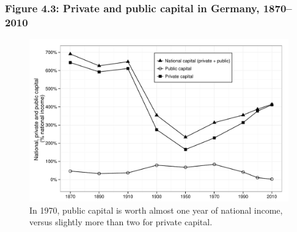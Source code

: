 \documentclass[t]{beamer}\usepackage[]{graphicx}\usepackage[]{color}
\newenvironment{knitrout}{}{} %
\begin{document}
\begin{frame}[label=Figure_4_3]
\frametitle{Figure 4.3: Private and public capital in Germany, 1870--2010}
\begin{figure}[t]
\begin{minipage}[b]{\textwidth}
\centering
\begin{knitrout}\footnotesize
{}\color{fgcolor}

{\centering \includegraphics[width=1\linewidth]{figures/bw/Figure_4_3} 

}



\end{knitrout}
\caption{In 1970, public capital is worth almost one year of national income, versus slightly more than two for private capital.}
\end{minipage}
\end{figure}
\end{frame}
\end{document}
